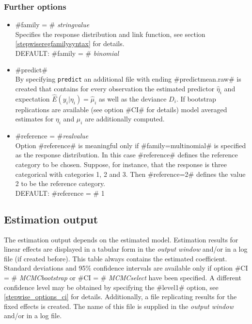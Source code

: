 \subsubsection*{Further options}
\label{stepwisereg_further_options}

\begin{itemize}
\item #family = # {\em stringvalue} \\
 Specifies the response distribution and link function, see section \autoref{stepwiseregfamilysyntax} for details. \\
DEFAULT: #family = # {\em binomial}
\item  #predict# \\
By specifying {\tt predict} an
additional file with ending #predictmean.raw# is created that contains for
every observation the estimated predictor $\hat \eta_i$ and
expectation $\hat E(y_i | \eta_i) = \hat \mu_i$ as well as the
deviance $D_i$.  If bootstrap replications are available (see option #CI# for details) model averaged estimates for $\eta_i$ and $\mu_i$
are additionally computed.
\item #reference = #{\em realvalue} \\
Option #reference# is meaningful only if  #family=multinomial# is
specified as the response distribution. In this case #reference#
defines the reference category to be chosen. Suppose, for
instance, that the response is three categorical with categories
1, 2 and 3. Then #reference=2# defines the value 2 to be the reference category. \\
DEFAULT: #reference = # 1
\end{itemize}










\subsection{Estimation output}

The estimation output depends on the estimated
model. Estimation results for linear effects are displayed in a
tabular form in the {\em output window} and/or in a log file (if
created before). This table always contains the estimated coefficient.
Standard deviations and  95\% confidence intervals are available only
if option #CI = # {\em MCMCbootstrap} or
#CI = # {\em MCMCselect} have been specified.
A different confidence level may be obtained by specifying the
#level1# option, see \autoref{stepwise_options_ci} for details.
Additionally, a file replicating results for the fixed effects is
created. The name of this file is supplied in the {\em output
window} and/or in a log file.

